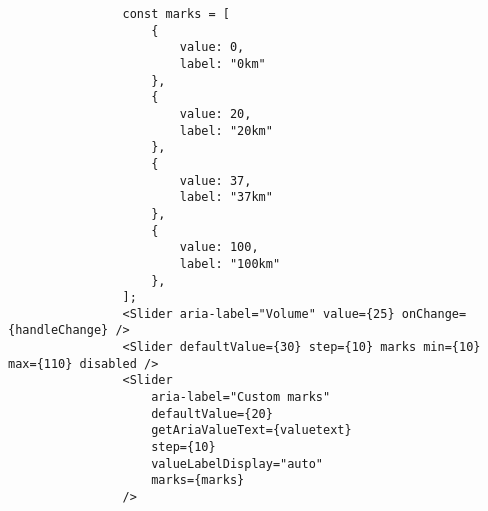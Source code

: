 \begin{itemize}
        \begin{lstlisting}
                const marks = [
                    {
                        value: 0,
                        label: "0km"
                    },
                    {
                        value: 20,
                        label: "20km"
                    },
                    {
                        value: 37,
                        label: "37km"
                    },
                    {
                        value: 100,
                        label: "100km"
                    },
                ];
                <Slider aria-label="Volume" value={25} onChange={handleChange} />
                <Slider defaultValue={30} step={10} marks min={10} max={110} disabled />
                <Slider
                    aria-label="Custom marks"
                    defaultValue={20}
                    getAriaValueText={valuetext}
                    step={10}
                    valueLabelDisplay="auto"
                    marks={marks}
                />
            \end{lstlisting}

\end{itemize}

